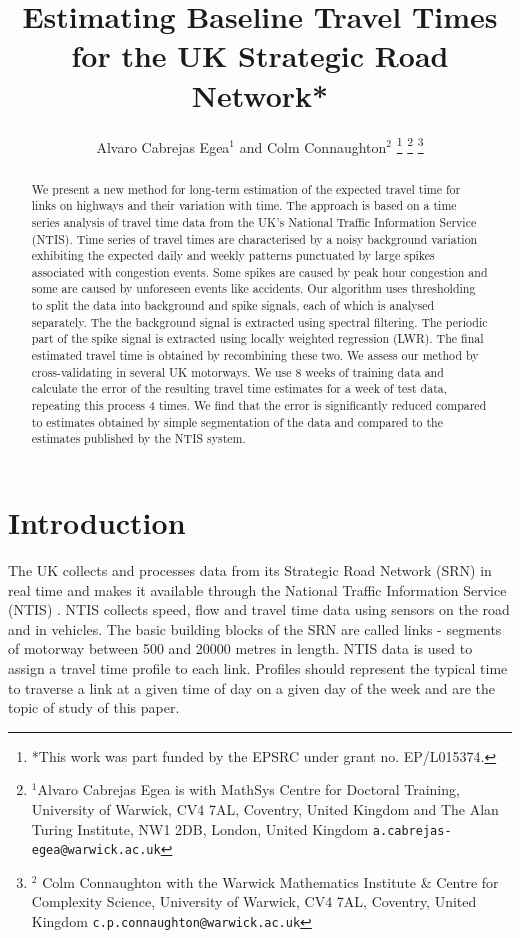 \documentclass[letterpaper, 10 pt, conference]{ieeeconf}  %
\title{\LARGE \bf
Estimating Baseline Travel Times for the UK Strategic Road Network*
}
\author{Alvaro Cabrejas Egea$^{1}$ and Colm Connaughton$^{2}$%
\thanks{*This work was part funded by the EPSRC under grant no. EP/L015374.}%
\thanks{$^{1}$Alvaro Cabrejas Egea is with MathSys Centre for Doctoral Training, University of Warwick, CV4 7AL, Coventry, United Kingdom and The Alan Turing Institute, NW1 2DB, London, United Kingdom
        {\tt\small a.cabrejas-egea@warwick.ac.uk}}%
\thanks{$^{2}$ Colm Connaughton with the Warwick Mathematics Institute \& Centre for Complexity Science, University of Warwick,
        CV4 7AL, Coventry, United Kingdom
        {\tt\small c.p.connaughton@warwick.ac.uk}}%
}
\begin{document}
\maketitle
\thispagestyle{empty}
\pagestyle{empty}


\begin{abstract}
We present a new method for long-term estimation of the expected travel time for links on highways and their variation with time.  
The approach is based on a time series analysis of travel time data from the UK's National Traffic Information Service (NTIS).  
Time series of travel times are characterised by a noisy background variation exhibiting the expected daily and weekly patterns punctuated by large spikes associated with congestion events. 
Some spikes are caused by peak hour congestion and some are caused by unforeseen events like accidents. 
Our algorithm uses thresholding to split the data into background and spike signals, each of which is analysed separately. 
The the background signal is extracted using spectral filtering. 
The periodic part of the spike signal is extracted using locally weighted regression (LWR). 
The final estimated travel time is obtained by recombining these two. 
We assess our method by cross-validating in several UK motorways. 
We use 8 weeks of training data and calculate the error of the resulting travel time estimates for a week of test data, repeating this process 4 times. 
We find that the error is significantly reduced compared to estimates obtained by simple segmentation of the data and compared to the estimates published by the NTIS system.
\end{abstract}

\section{Introduction}
The UK collects and processes data from its Strategic Road Network (SRN) in real time and makes it available through the National Traffic Information Service (NTIS) \cite{NTIS}. 
NTIS collects speed, flow and travel time data using sensors on the road and in vehicles. 
The basic building blocks of the SRN are called links -  segments of motorway between 500 and 20000 metres in length.  
NTIS data is used to assign a travel time profile to each link. 
Profiles should represent the typical time to traverse a link at a given time of day on a given day of the week and are the topic of study of this paper.
 
\end{document}
